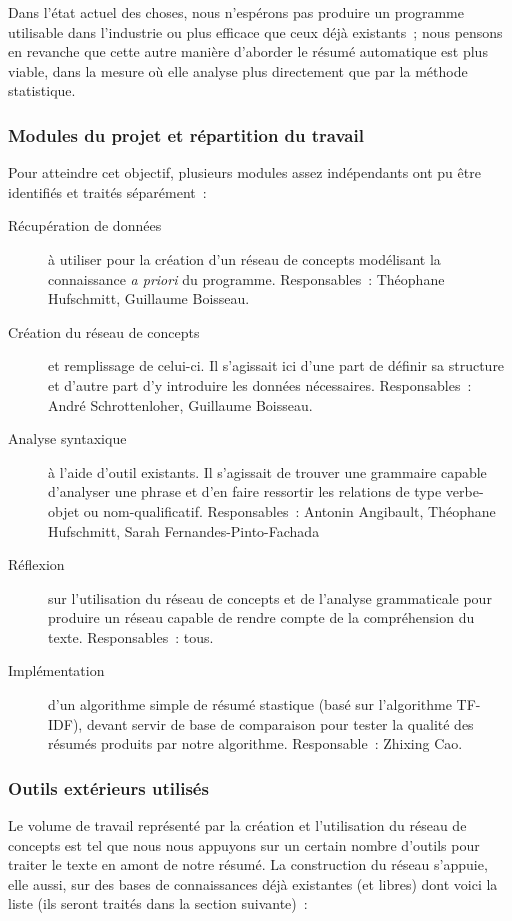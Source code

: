 \documentclass[a4paper, 12pt]{article}
\begin{document}
Dans l'état actuel des choses, nous n'espérons pas produire un programme utilisable dans l'industrie ou plus efficace que ceux déjà existants~; nous pensons en revanche que cette autre manière d'aborder le résumé automatique est plus viable, dans la mesure où elle analyse plus directement que par la méthode statistique.

\subsubsection{Modules du projet et répartition du travail}
Pour atteindre cet objectif, plusieurs modules assez indépendants ont pu être identifiés et traités séparément~:

\begin{description}
	\item[Récupération de données] à utiliser pour la création d'un réseau de concepts modélisant la connaissance \textit{a priori} du programme. Responsables~: Théophane Hufschmitt, Guillaume Boisseau.
	\item[Création du réseau de concepts] et remplissage de celui-ci. Il s'agissait ici d'une part de définir sa structure et d'autre part d'y introduire les données nécessaires. Responsables~: André Schrottenloher, Guillaume Boisseau.
	\item[Analyse syntaxique] à l'aide d'outil existants. Il s'agissait de trouver une grammaire capable d'analyser une phrase et d'en faire ressortir les relations de type verbe-objet ou nom-qualificatif. Responsables~: Antonin Angibault, Théophane Hufschmitt, Sarah Fernandes-Pinto-Fachada
	\item[Réflexion] sur l'utilisation du réseau de concepts et de l'analyse grammaticale pour produire un réseau capable de rendre compte de la compréhension du texte. Responsables~: tous.
	\item[Implémentation] d'un algorithme simple de résumé stastique (basé sur l'algorithme TF-IDF), devant servir de base de comparaison pour tester la qualité des résumés produits par notre algorithme.  Responsable~: Zhixing Cao.
\end{description}

\subsubsection{Outils extérieurs utilisés}

Le volume de travail représenté par la création et l'utilisation du réseau de concepts est tel que nous nous appuyons sur un certain nombre d'outils pour traiter le texte en amont de notre résumé. La construction du réseau s'appuie, elle aussi, sur des bases de connaissances déjà existantes (et libres) dont voici la liste (ils seront traités dans la section suivante)~:
\end{document}
